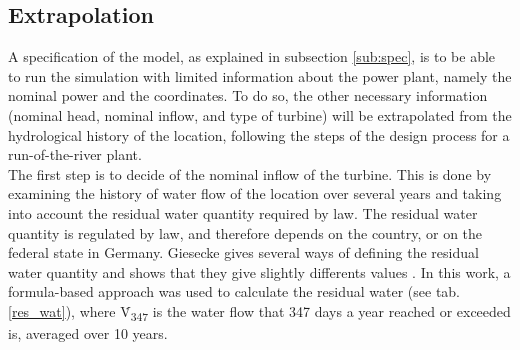 \subsection{Extrapolation}
\label{sub:extrapolation}
A specification of the model, as explained in subsection \ref{sub:spec}, is to be able to run the simulation with limited information about the power plant, namely the nominal power and the coordinates. To do so, the other necessary information (nominal head, nominal inflow, and type of turbine) will be extrapolated from the hydrological history of the location, following the steps of the design process for a run-of-the-river plant.\\
The first step is to decide of the nominal inflow of the turbine. This is done by examining the history of water flow of the location over several years and taking into account the residual water quantity required by law.
The residual water quantity is regulated by law, and therefore depends on the country, or on the federal state in Germany. Giesecke gives several ways of defining the residual water quantity and shows that they give slightly differents values \cite{gies_qrest}. In this work, a formula-based approach was used to calculate the residual water (see tab. \ref{res_wat}), where \.{V}\textsubscript{347} is the water flow that 347 days a year reached or exceeded is, averaged over 10 years. 
